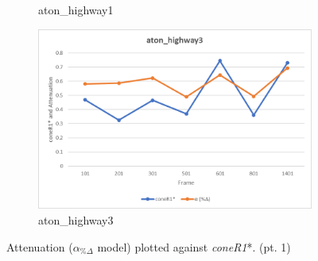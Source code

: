 \begin{appendices}
\begin{figure}
\begin{subfigure}{.45\linewidth}
  \caption{aton\_highway1}
\end{subfigure}
\hfill
\begin{subfigure}{.45\linewidth}
  \includegraphics[width=1\linewidth]{figures/appendix/highway3_rgb.jpg}
  \caption{aton\_highway3}
\end{subfigure}

\caption{Attenuation ($\alpha_{\%\Delta}$ model) plotted against \textit{coneR1}*. (pt. 1)}
\end{figure}


\end{appendices}
